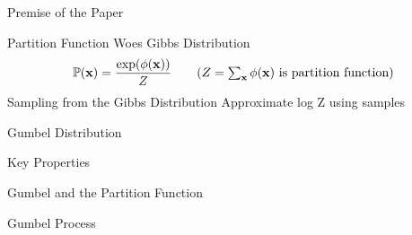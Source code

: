 \begin{frame}{Premise of the Paper}
\end{frame}

\begin{frame}{Partition Function Woes}
  Gibbs Distribution
  \begin{align*}
    \Pr(\x) =\frac{\exp(\phi(\x))}{Z} \tag{$Z=\sum_{\x} \phi(\x)$ is partition function}
  \end{align*}
  Sampling from the Gibbs Distribution
  Approximate log Z using samples 
\end{frame}

\begin{frame}{Gumbel Distribution}
\end{frame}

\begin{frame}{Key Properties}
  
\end{frame}

\begin{frame}{Gumbel and the Partition Function}
  
\end{frame}

\begin{frame}{Gumbel Process}
\end{frame}

